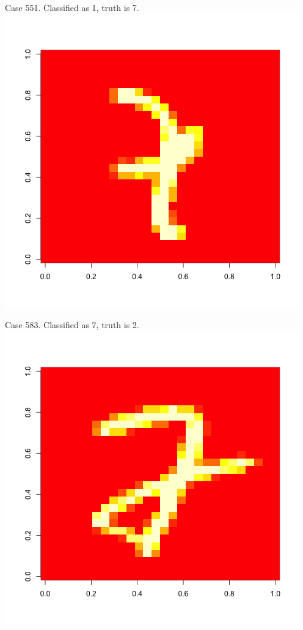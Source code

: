 \documentclass[10pt]{extarticle}
\begin{document}
Case 551. Classified as 1, truth is 7. 
\includegraphics[scale=.4] {../Images/551.png}

Case 583. Classified as 7, truth is 2. 
\includegraphics[scale=.4] {../Images/583.png}
\end{document}
